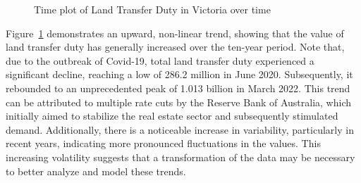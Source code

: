 \documentclass[
  11pt,
  a4paper,
]{article}
\begin{document}
\begin{figure}


\caption{\label{fig-trend}Time plot of Land Transfer Duty in Victoria
over time}

\end{figure}%

Figure~\ref{fig-trend} demonstrates an upward, non-linear trend, showing
that the value of land transfer duty has generally increased over the
ten-year period. Note that, due to the outbreak of Covid-19, total land
transfer duty experienced a significant decline, reaching a low of 286.2
million in June 2020. Subsequently, it rebounded to an unprecedented
peak of 1.013 billion in March 2022. This trend can be attributed to
multiple rate cuts by the Reserve Bank of Australia, which initially
aimed to stabilize the real estate sector and subsequently stimulated
demand. Additionally, there is a noticeable increase in variability,
particularly in recent years, indicating more pronounced fluctuations in
the values. This increasing volatility suggests that a transformation of
the data may be necessary to better analyze and model these trends.
\end{document}
